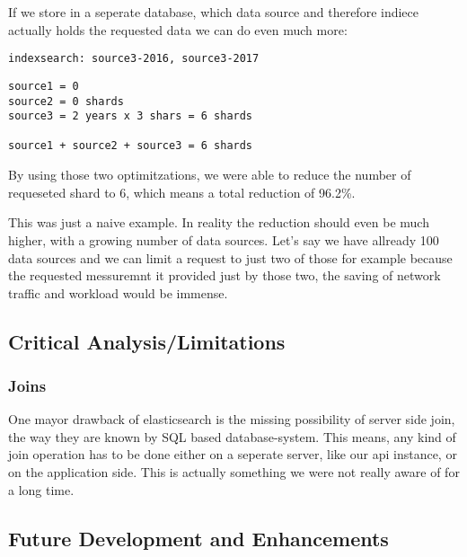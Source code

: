 If we store in a seperate database, which data source and therefore
indiece actually holds the requested data we can do even much more:

\begin{verbatim}
indexsearch: source3-2016, source3-2017
\end{verbatim}

\begin{verbatim}
source1 = 0
source2 = 0 shards
source3 = 2 years x 3 shars = 6 shards

source1 + source2 + source3 = 6 shards
\end{verbatim}

By using those two optimitzations, we were able to reduce the number of
requeseted shard to 6, which means a total reduction of 96.2\%.

This was just a naive example. In reality the reduction should even be
much higher, with a growing number of data sources. Let's say we have
allready 100 data sources and we can limit a request to just two of
those for example because the requested messuremnt it provided just by
those two, the saving of network traffic and workload would be immense.

\subsection{Critical
Analysis/Limitations}\label{critical-analysislimitations}

\subsubsection{Joins}\label{joins}

One mayor drawback of elasticsearch is the missing possibility of server
side join, the way they are known by SQL based database-system. This
means, any kind of join operation has to be done either on a seperate
server, like our api instance, or on the application side. This is
actually something we were not really aware of for a long time.

\subsection{Future Development and
Enhancements}\label{future-development-and-enhancements}
